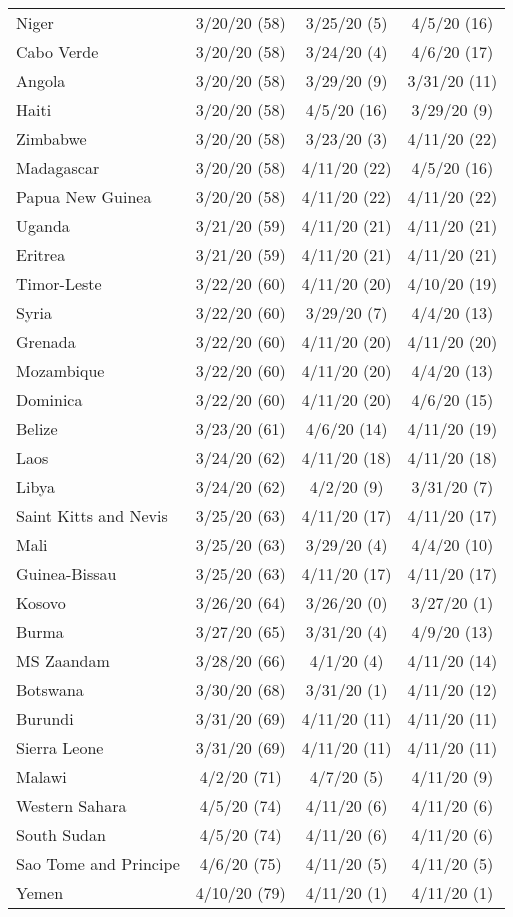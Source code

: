\begin{table}[h]
\begin{longtable}{p{} c c c}
\hline 
Niger & 3/20/20 (58)  & 3/25/20 (5)  & 4/5/20 (16) \\
Cabo Verde & 3/20/20 (58)  & 3/24/20 (4)  & 4/6/20 (17) \\
Angola & 3/20/20 (58)  & 3/29/20 (9)  & 3/31/20 (11) \\
Haiti & 3/20/20 (58)  & 4/5/20 (16)  & 3/29/20 (9) \\
Zimbabwe & 3/20/20 (58)  & 3/23/20 (3)  & 4/11/20 (22) \\
Madagascar & 3/20/20 (58)  & 4/11/20 (22)  & 4/5/20 (16) \\
Papua New Guinea & 3/20/20 (58)  & 4/11/20 (22)  & 4/11/20 (22) \\
\hline 
Uganda & 3/21/20 (59)  & 4/11/20 (21)  & 4/11/20 (21) \\
Eritrea & 3/21/20 (59)  & 4/11/20 (21)  & 4/11/20 (21) \\
\hline 
Timor-Leste & 3/22/20 (60)  & 4/11/20 (20)  & 4/10/20 (19) \\
Syria & 3/22/20 (60)  & 3/29/20 (7)  & 4/4/20 (13) \\
Grenada & 3/22/20 (60)  & 4/11/20 (20)  & 4/11/20 (20) \\
Mozambique & 3/22/20 (60)  & 4/11/20 (20)  & 4/4/20 (13) \\
Dominica & 3/22/20 (60)  & 4/11/20 (20)  & 4/6/20 (15) \\
\hline 
Belize & 3/23/20 (61)  & 4/6/20 (14)  & 4/11/20 (19) \\
\hline 
Laos & 3/24/20 (62)  & 4/11/20 (18)  & 4/11/20 (18) \\
Libya & 3/24/20 (62)  & 4/2/20 (9)  & 3/31/20 (7) \\
\hline 
Saint Kitts and Nevis & 3/25/20 (63)  & 4/11/20 (17)  & 4/11/20 (17) \\
Mali & 3/25/20 (63)  & 3/29/20 (4)  & 4/4/20 (10) \\
Guinea-Bissau & 3/25/20 (63)  & 4/11/20 (17)  & 4/11/20 (17) \\
\hline 
Kosovo & 3/26/20 (64)  & 3/26/20 (0)  & 3/27/20 (1) \\
\hline 
Burma & 3/27/20 (65)  & 3/31/20 (4)  & 4/9/20 (13) \\
\hline 
MS Zaandam & 3/28/20 (66)  & 4/1/20 (4)  & 4/11/20 (14) \\
\hline 
Botswana & 3/30/20 (68)  & 3/31/20 (1)  & 4/11/20 (12) \\
\hline 
Burundi & 3/31/20 (69)  & 4/11/20 (11)  & 4/11/20 (11) \\
Sierra Leone & 3/31/20 (69)  & 4/11/20 (11)  & 4/11/20 (11) \\
\hline 
Malawi & 4/2/20 (71)  & 4/7/20 (5)  & 4/11/20 (9) \\
\hline 
Western Sahara & 4/5/20 (74)  & 4/11/20 (6)  & 4/11/20 (6) \\
South Sudan & 4/5/20 (74)  & 4/11/20 (6)  & 4/11/20 (6) \\
\hline 
Sao Tome and Principe & 4/6/20 (75)  & 4/11/20 (5)  & 4/11/20 (5) \\
\hline 
Yemen & 4/10/20 (79)  & 4/11/20 (1)  & 4/11/20 (1) \\
\hline
\end{longtable}
\end{table}